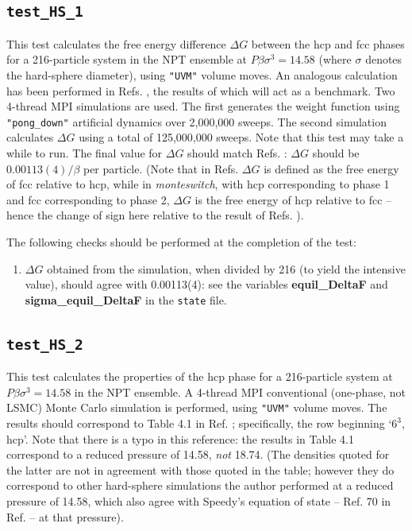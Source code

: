 \documentclass{report}
\begin{document}
\subsection{\texttt{test\_HS\_1}}
This test calculates the free energy difference $\Delta G$ between the hcp and fcc phases for a 216-particle system in the NPT ensemble at
$P\beta\sigma^3=14.58$ (where $\sigma$ denotes the hard-sphere diameter), using \texttt{"UVM"} volume moves. An analogous calculation
has been performed in Refs. \cite{thesis:Jackson,Bruce_2000}, the results of which will act as a benchmark.
Two 4-thread MPI simulations are used. The first generates the weight function using \texttt{"pong\_down"}
artificial dynamics over 2,000,000 sweeps. The second simulation calculates $\Delta G$ using a total of 125,000,000 sweeps. 
Note that this test may take a while to run. The final value for $\Delta G$ should match Refs. \cite{thesis:Jackson,Bruce_2000}: 
$\Delta G$ should be $0.00113(4)/\beta$ per particle. (Note that in Refs. \cite{thesis:Jackson,Bruce_2000} $\Delta G$ is defined as
the free energy of fcc relative to hcp, while in \emph{monteswitch}, with hcp corresponding to phase 1 and fcc corresponding to phase 2, 
$\Delta G$ is the free energy of hcp relative to fcc -- hence the change of sign here relative to the result of Refs. 
\cite{thesis:Jackson,Bruce_2000}).

The following checks should be performed at the completion of the test:
\begin{enumerate}
\item
$\Delta G$ obtained from the simulation, when divided by 216 (to yield the intensive value), should agree with 0.00113(4):
see the variables \textbf{equil\_DeltaF} and \textbf{sigma\_equil\_DeltaF} in the \texttt{state} file.
\end{enumerate}


\subsection{\texttt{test\_HS\_2}}
This test calculates the properties of the hcp phase for a 216-particle system at $P\beta\sigma^3=14.58$ in
the NPT ensemble. A 4-thread MPI conventional (one-phase, not LSMC) Monte Carlo simulation is performed, using \texttt{"UVM"} volume moves. The
results should correspond to Table 4.1 in Ref. \cite{thesis:Jackson}; specifically, the row beginning `$6^3$, hcp'. Note
that there is a typo in this reference: the results in Table 4.1 correspond to a reduced pressure of 14.58, \emph{not}
18.74. (The densities quoted for the latter are not in agreement with those quoted in the table; however they
do correspond to other hard-sphere simulations the author performed at a reduced pressure of 14.58, which also agree with
Speedy's equation of state -- Ref. 70 in Ref. \cite{thesis:Jackson} -- at that pressure).
\end{document}
